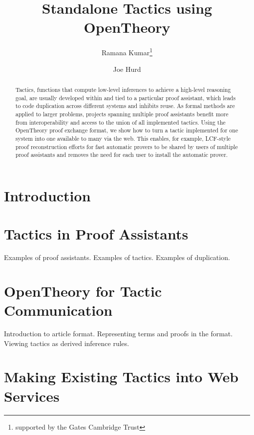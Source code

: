 \documentclass{llncs}
\newcommand{\OpenTheory}{OpenTheory\xspace}
\begin{document}
\title{Standalone Tactics using OpenTheory}

\author{Ramana Kumar\thanks{supported by the Gates Cambridge Trust}\and Joe Hurd}


\maketitle

\begin{abstract}
Tactics, functions that compute low-level inferences to achieve a high-level reasoning goal, are usually developed within and tied to a particular proof assistant, which leads to code duplication across different systems and inhibits reuse.
As formal methods are applied to larger problems, projects spanning multiple proof assistants benefit more from interoperability and access to the union of all implemented tactics.
Using the OpenTheory proof exchange format, we show how to turn a tactic implemented for one system into one available to many via the web.
This enables, for example, LCF-style proof reconstruction efforts for fast automatic provers to be shared by users of multiple proof assistants and removes the need for each user to install the automatic prover.
\end{abstract}

\section{Introduction}

\section{Tactics in Proof Assistants}

Examples of proof assistants.
Examples of tactics.
Examples of duplication.

\section{\OpenTheory for Tactic Communication}

Introduction to article format.
Representing terms and proofs in the format.
Viewing tactics as derived inference rules.

\section{Making Existing Tactics into Web Services}
\end{document}
